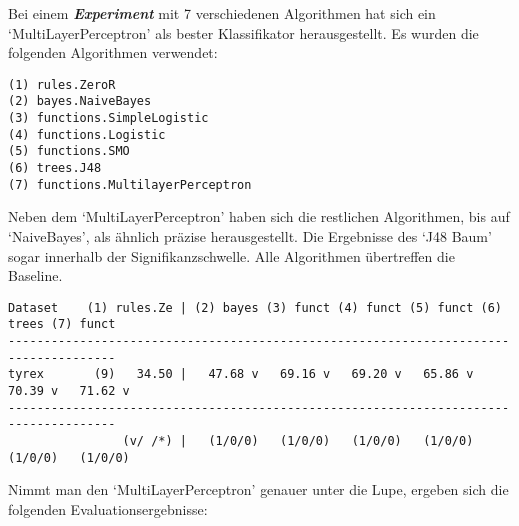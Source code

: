 \documentclass[]{article}
\begin{document}
Bei einem \textbf{\emph{Experiment}} mit 7 verschiedenen Algorithmen hat
sich ein `MultiLayerPerceptron' als bester Klassifikator herausgestellt.
Es wurden die folgenden Algorithmen verwendet:

\vspace{4 mm}\begin{verbatim}
(1) rules.ZeroR
(2) bayes.NaiveBayes
(3) functions.SimpleLogistic
(4) functions.Logistic
(5) functions.SMO
(6) trees.J48
(7) functions.MultilayerPerceptron 
\end{verbatim}\vspace{4 mm}

Neben dem `MultiLayerPerceptron' haben sich die restlichen Algorithmen,
bis auf `NaiveBayes', als ähnlich präzise herausgestellt. Die Ergebnisse
des `J48 Baum' sogar innerhalb der Signifikanzschwelle. Alle Algorithmen
übertreffen die Baseline.

\vspace{4 mm}\begin{verbatim}
Dataset    (1) rules.Ze | (2) bayes (3) funct (4) funct (5) funct (6) trees (7) funct
-------------------------------------------------------------------------------------
tyrex       (9)   34.50 |   47.68 v   69.16 v   69.20 v   65.86 v   70.39 v   71.62 v
-------------------------------------------------------------------------------------
                (v/ /*) |   (1/0/0)   (1/0/0)   (1/0/0)   (1/0/0)   (1/0/0)   (1/0/0)
\end{verbatim}\vspace{4 mm}

Nimmt man den `MultiLayerPerceptron' genauer unter die Lupe, ergeben
sich die folgenden Evaluationsergebnisse:
\end{document}

